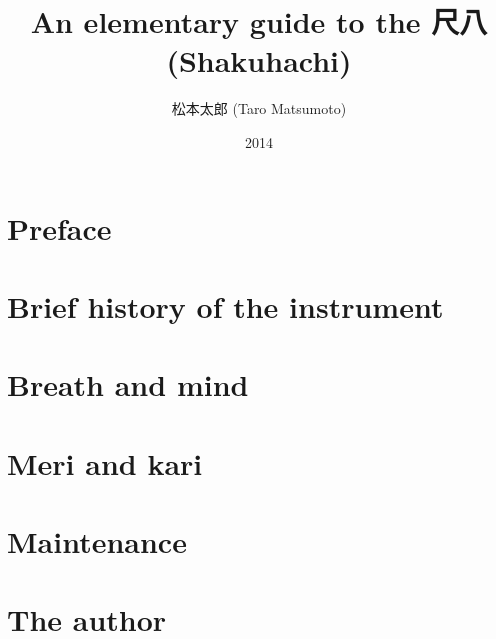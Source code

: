 \documentclass[b5paper,draft]{memoir}
\begin{document}
\title{An elementary guide to the 尺八 (Shakuhachi)}
\author{松本太郎 (Taro Matsumoto)}
\date{2014}
\maketitle

\frontmatter

\section{Preface}


\mainmatter

\section{Brief history of the instrument}


\section{Breath and mind}


\section{Meri and kari}


\section{Maintenance}


\backmatter

\section{The author}

\end{document}
